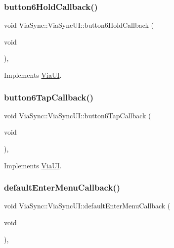 \subsubsection{\texorpdfstring{button6\+Hold\+Callback()}{button6HoldCallback()}}
{\footnotesize\ttfamily void Via\+Sync\+::\+Via\+Sync\+U\+I\+::button6\+Hold\+Callback (\begin{DoxyParamCaption}\item[{void}]{ }\end{DoxyParamCaption})\hspace{0.3cm}{\ttfamily [override]}, {\ttfamily [virtual]}}



Implements \mbox{\hyperlink{class_via_u_i_afa66f7946b6cf755b94383715b26a651}{Via\+UI}}.

\mbox{\label{class_via_sync_1_1_via_sync_u_i_a553dc53213d1b4b62d7aead58533c511}} 
\subsubsection{\texorpdfstring{button6\+Tap\+Callback()}{button6TapCallback()}}
{\footnotesize\ttfamily void Via\+Sync\+::\+Via\+Sync\+U\+I\+::button6\+Tap\+Callback (\begin{DoxyParamCaption}\item[{void}]{ }\end{DoxyParamCaption})\hspace{0.3cm}{\ttfamily [override]}, {\ttfamily [virtual]}}



Implements \mbox{\hyperlink{class_via_u_i_a8a6bf29d336faa8e9d026a84be45d956}{Via\+UI}}.

\mbox{\label{class_via_sync_1_1_via_sync_u_i_a53dbd5157906ae81c3d54a56eafbf06e}} 
\subsubsection{\texorpdfstring{default\+Enter\+Menu\+Callback()}{defaultEnterMenuCallback()}}
{\footnotesize\ttfamily void Via\+Sync\+::\+Via\+Sync\+U\+I\+::default\+Enter\+Menu\+Callback (\begin{DoxyParamCaption}\item[{void}]{ }\end{DoxyParamCaption})\hspace{0.3cm}{\ttfamily [override]}, {\ttfamily [virtual]}}



